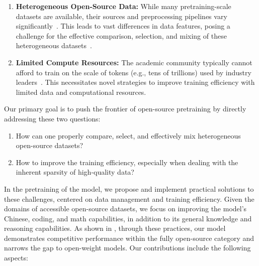 \begin{enumerate}
\item \textbf{Heterogeneous Open-Source Data:} While many pretraining-scale datasets are available, their sources and preprocessing pipelines vary significantly~\citep{DCLM,fineweb,stack-v2}. This leads to vast differences in data features, posing a challenge for the effective comparison, selection, and mixing of these heterogeneous datasets~\citep{su2025nemotroncctransformingcommoncrawl}.
\item \textbf{Limited Compute Resources:} The academic community typically cannot afford to train on the scale of tokens (e.g., tens of trillions) used by industry leaders~\citep{qwen3}. This necessitates novel strategies to improve training efficiency with limited data and computational resources.
\end{enumerate}

\noindent  Our primary goal is to push the frontier of open-source pretraining by directly addressing these two questions:
\begin{enumerate}
\item How can one properly compare, select, and effectively mix heterogeneous open-source datasets?
\item How to improve the training efficiency, especially when dealing with the inherent sparsity of high-quality data?
\end{enumerate}

In the pretraining of the \sys model, we propose and implement practical solutions to these challenges, centered on data management and training efficiency. Given the domains of accessible open-source datasets, we focus on improving the model's Chinese, coding, and math capabilities, in addition to its general knowledge and reasoning capabilities. As shown in , through these practices, our \sys model demonstrates competitive performance within the fully open-source category and narrows the gap to open-weight models. Our contributions include the following aspects:

